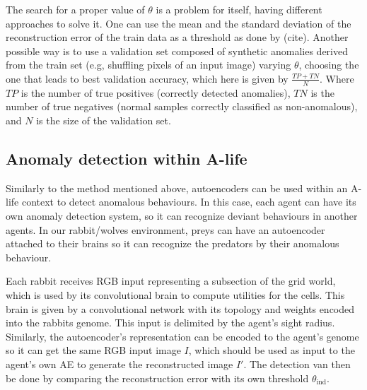 \documentclass[letterpaper]{article}
\numberwithin{equation}{section}
\numberwithin{theorem}{section}
\numberwithin{lemma}{section}
\numberwithin{df}{section}
\begin{document}
The search for a proper value of $\theta$ is a problem for itself, having different approaches to solve it. One can use the mean and the standard deviation of the reconstruction error of the train data as a threshold as done by (cite). Another possible way is to use a validation set composed of synthetic anomalies derived from the train set (e.g, shuffling pixels of an input image) varying $\theta$, choosing the one that leads to best validation accuracy, which here is given by $\frac{TP + TN}{N}$. Where $TP$ is the number of true positives (correctly detected anomalies), $TN$ is the number of true negatives (normal samples correctly classified as non-anomalous), and $N$ is the size of the validation set.

\subsection{Anomaly detection within A-life}

Similarly to the method mentioned above, autoencoders can be used within an A-life context to detect anomalous behaviours. In this case, each agent can have its own anomaly detection system, so it can recognize deviant behaviours in another agents.  In our rabbit/wolves environment, preys can have an autoencoder attached to their brains so it can recognize the predators by their anomalous behaviour.

Each rabbit receives RGB input representing a subsection of the grid world, which is used by its convolutional brain to compute utilities for the cells. This brain is given by a convolutional network with its topology and weights encoded into the rabbits genome. This input is delimited by the agent's sight radius. Similarly, the autoencoder's representation can be encoded to the agent's genome so it can get the same RGB input image $I$, which should be used as input to the agent's own AE to generate the reconstructed image $I'$. The detection van then be done by comparing the reconstruction error with its own threshold $\theta_\text{ind}$.
\end{document}

